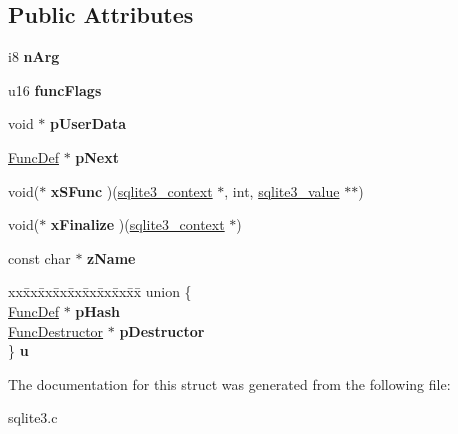 \subsection*{Public Attributes}
\begin{DoxyCompactItemize}
\item 
i8 {\bfseries n\+Arg}\hypertarget{structFuncDef_a65d2af5dc68a0344efb368b8ce1b9141}{}\label{structFuncDef_a65d2af5dc68a0344efb368b8ce1b9141}

\item 
u16 {\bfseries func\+Flags}\hypertarget{structFuncDef_a4cd12fdb0da08ec8a5fb41f8bcd09e78}{}\label{structFuncDef_a4cd12fdb0da08ec8a5fb41f8bcd09e78}

\item 
void $\ast$ {\bfseries p\+User\+Data}\hypertarget{structFuncDef_a04fdde2f96be198823a483bebcfd3ae3}{}\label{structFuncDef_a04fdde2f96be198823a483bebcfd3ae3}

\item 
\hyperlink{structFuncDef}{Func\+Def} $\ast$ {\bfseries p\+Next}\hypertarget{structFuncDef_a1ebe547d000172d9ae44d12eeb433a48}{}\label{structFuncDef_a1ebe547d000172d9ae44d12eeb433a48}

\item 
void($\ast$ {\bfseries x\+S\+Func} )(\hyperlink{structsqlite3__context}{sqlite3\+\_\+context} $\ast$, int, \hyperlink{structMem}{sqlite3\+\_\+value} $\ast$$\ast$)\hypertarget{structFuncDef_a64986fd7c3b2a3715f5e7a54c0ef385e}{}\label{structFuncDef_a64986fd7c3b2a3715f5e7a54c0ef385e}

\item 
void($\ast$ {\bfseries x\+Finalize} )(\hyperlink{structsqlite3__context}{sqlite3\+\_\+context} $\ast$)\hypertarget{structFuncDef_a2315fa9b1a173dca2ba0c506548b83f9}{}\label{structFuncDef_a2315fa9b1a173dca2ba0c506548b83f9}

\item 
const char $\ast$ {\bfseries z\+Name}\hypertarget{structFuncDef_ac732c25b31e5c5a5390db76e74724024}{}\label{structFuncDef_ac732c25b31e5c5a5390db76e74724024}

\item 
\begin{tabbing}
xx\=xx\=xx\=xx\=xx\=xx\=xx\=xx\=xx\=\kill
union \{\\
\>\hyperlink{structFuncDef}{FuncDef} $\ast$ {\bfseries pHash}\\
\>\hyperlink{structFuncDestructor}{FuncDestructor} $\ast$ {\bfseries pDestructor}\\
\} {\bfseries u}\hypertarget{structFuncDef_a0ed4a95c4ba5c803bfe7adf48888c2dd}{}\label{structFuncDef_a0ed4a95c4ba5c803bfe7adf48888c2dd}
\\

\end{tabbing}\end{DoxyCompactItemize}


The documentation for this struct was generated from the following file\+:\begin{DoxyCompactItemize}
\item 
sqlite3.\+c\end{DoxyCompactItemize}
